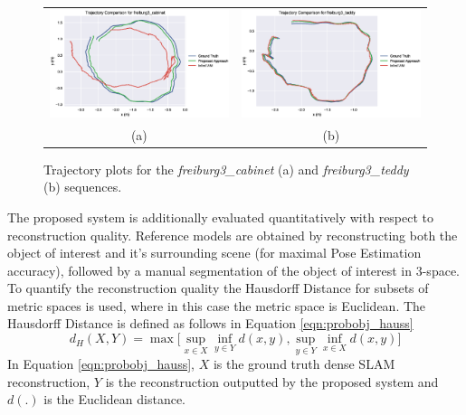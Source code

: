 \begin{figure}[h]
  \label{fig:probobj_traj}
  \centering
  \begin{tabular}{cc}
  \includegraphics[width=.5\linewidth]{figures/object_recon/plots/traj/cab_traj.eps} & 
  \includegraphics[width=.5\linewidth]{figures/object_recon/plots/traj/ted_traj.eps} \\
  (a) & (b)
  \end{tabular}
  \caption[Probabilistic Object Reconstruction Trajectory Plots]
  {Trajectory plots for the \textit{freiburg3\_cabinet} (a) 
  and \textit{\textsf{freiburg3\_teddy}} (b) sequences.}
\end{figure}

The proposed system is additionally evaluated quantitatively with respect to reconstruction 
quality. Reference models are obtained by reconstructing both the object of interest and it's 
surrounding scene (for maximal Pose Estimation accuracy), followed by a manual segmentation of 
the object of interest in 3-space. To quantify the reconstruction quality the Hausdorff 
Distance \cite{Hausdorff} for subsets of metric spaces is used, where in this case the metric 
space is Euclidean. The Hausdorff Distance is defined as follows in Equation \ref{eqn:probobj_hauss}
\begin{equation}
  \label{eqn:probobj_hauss}
  d_{H}(X, Y) = \max \Bigg[
  \sup_{x \in X} \inf_{y \in Y} d(x, y), \sup_{y \in Y} \inf_{x \in X} d(x, y) 
  \Bigg]
\end{equation}
In Equation \ref{eqn:probobj_hauss}, $X$ is the ground truth dense SLAM reconstruction, 
$Y$ is the reconstruction outputted by the proposed system and $d(.)$ is the Euclidean 
distance.

